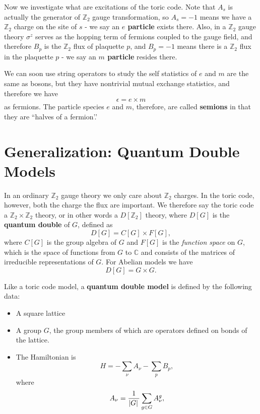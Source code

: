 \documentclass[hyperref, a4paper]{article}
\newcommand*{\concept}[1]{{\textbf{#1}}}
\begin{document}
Now we investigate what are excitations of the toric code. Note that $A_s$ is actually the generator of $\mathbb{Z}_2$ gauge transformation, so $A_s = -1$ means we have a $\mathbb{Z}_2$ charge on the site of $s$ - we say an \concept{$e$ particle} exists there.
Also, in a $\mathbb{Z}_2$ gauge theory $\sigma^z$ serves as the hopping term of fermions coupled to the gauge field,
and therefore $B_p$ is the $\mathbb{Z}_2$ flux of plaquette $p$, and $B_p = -1$ means there is a $\mathbb{Z}_2$ flux in the plaquette $p$ - we say an \concept{$m$ particle} resides there.

We can soon use string operators to study the self statistics of $e$ and $m$ are the same as bosons, but they have nontrivial mutual exchange statistics, and therefore we have 
\begin{equation}
    \epsilon = e \times m
\end{equation}
as fermions.
The particle species $e$ and $m$, therefore, are called \concept{semions} in that they are ``halves of a fermion'.'

\section{Generalization: Quantum Double Models}

In an ordinary $\mathbb{Z}_2$ gauge theory we only care about $\mathbb{Z}_2$ charges.
In the toric code, however, both the charge the flux are important.
We therefore say the toric code a $\mathbb{Z}_2 \times \mathbb{Z}_2$ theory, or in other words a $D[\mathbb{Z}_2]$ theory, where $D[G]$ is the \concept{quantum double} of $G$, defined as
\begin{equation}
    D[G] = C[G] \times F[G],
\end{equation}
where $C[G]$ is the group algebra of $G$ and $F[G]$ is the \emph{function space} on $G$, which is the space of functions from $G$ to $\mathbb{C}$ and consists of the matrices of irreducible representations of $G$.
For Abelian models we have 
\begin{equation}
    D[G] = G \times G.
\end{equation}

Like a toric code model, a \concept{quantum double model} is defined by the following data:
\begin{itemize}
    \item A square lattice 
    \item A group $G$, the group members of which are operators defined on bonds of the lattice.
    \item The Hamiltonian is 
    \begin{equation}
        H = - \sum_\nu A_\nu - \sum_p B_p,
    \end{equation}
    where 
    \begin{equation}
        A_\nu = \frac{1}{\abs*{G}} \sum_{g \in G} A_\nu^g,
    \end{equation}
\end{itemize}
\end{document}

